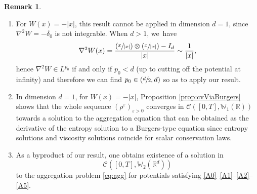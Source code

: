 \documentclass[11pt]{article}
\newcommand{\skpt}{\smallskip}
\numberwithin{equation}{section}
\newcommand{\Psfrac}[2]{(\sfrac{#1}{#2})}
\def\RR{\mathbb{R}}
\def\WW{\mathbb{W}}
\def\eps{\varepsilon}
\def\calC{{\mathcal C}}
\theoremstyle{plain}
\theoremstyle{definition}
\newtheorem{remark}[theorem]{Remark}
\begin{document}
\skpt
\begin{remark}
\begin{enumerate}
\item For $W(x) = -|x|$, this result cannot be applied in dimension $d=1$, since $\nabla^2 W = - \delta_0$ is not integrable. When $d>1$, we~have
\[
\nabla^2 W(x) = \frac{\Psfrac{x}{|x|} \otimes \Psfrac{x}{|x|} - I_d}{|x|} \sim \frac{1}{|x|},
\]
hence $\nabla^2 W \in L^{p_0}$ if and only if $p_0 < d$ (up to cutting off the potential at infinity) and therefore we can find $p_0 \in(\sfrac d2, d)$ so as to apply our result.
\item In dimension $d=1$, for $W(x) = - |x|$, Proposition \ref{prop:cvViaBurgers} shows that the whole sequence $(\rho^\eps)_{\eps > 0}$ converges in $\calC([0,T], \WW_1(\RR))$ towards a solution to the aggregation equation that can be obtained as the derivative of the entropy solution to a Burgers-type equation since entropy solutions and viscosity solutions coincide for scalar conservation laws.
\item As a byproduct of our result, one obtains existence of a solution in
\[
\calC([0,T], \WW _2(\RR^d))
\]
to the aggregation problem \eqref{eq:agg} for potentials satisfying \eqref{A0}--\eqref{A1}--\eqref{A2}--\eqref{A5}.
\end{enumerate}
\end{remark}
\end{document}
